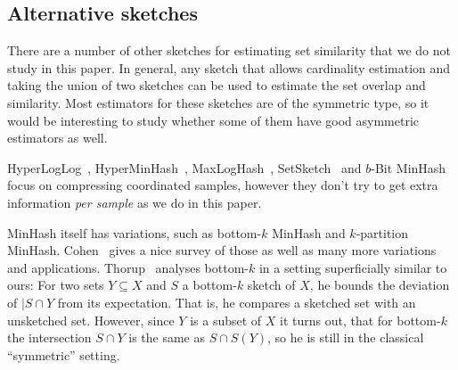 
\subsection{Alternative sketches}

There are a number of other sketches for estimating set similarity that we do not study in this paper.
In general, any sketch that allows cardinality estimation and taking the union of two sketches can be used to estimate the set overlap and similarity.
Most estimators for these sketches are of the symmetric type, so it would be interesting to study whether some of them have good asymmetric estimators as well.

HyperLogLog~\cite{flajolet2007hyperloglog}, HyperMinHash~\cite{yu2020hyperminhash}, MaxLogHash~\cite{wang2019memory}, SetSketch~\cite{DBLP:journals/corr/abs-2101-00314} and $b$-Bit MinHash~\cite{li2010b} focus on compressing coordinated samples, however they don't try to get extra information \emph{per sample} as we do in this paper.

MinHash itself has variations, such as bottom-$k$ MinHash and $k$-partition MinHash.
Cohen~\cite{DBLP:reference/algo/Cohen16b} gives a nice survey of those as well as many more variations and applications.
Thorup~\cite{thorup2013bottom} analyses bottom-$k$ in a setting superficially similar to ours: For two sets $Y\subseteq X$ and $S$ a bottom-$k$ sketch of $X$, he bounds the deviation of $|S\cap Y$ from its expectation.
That is, he compares a sketched set with an unsketched set.
However, since $Y$ is a subset of $X$ it turns out, that for bottom-$k$ the intersection $S\cap Y$ is the same as $S\cap S(Y)$, so he is still in the classical ``symmetric'' setting.


